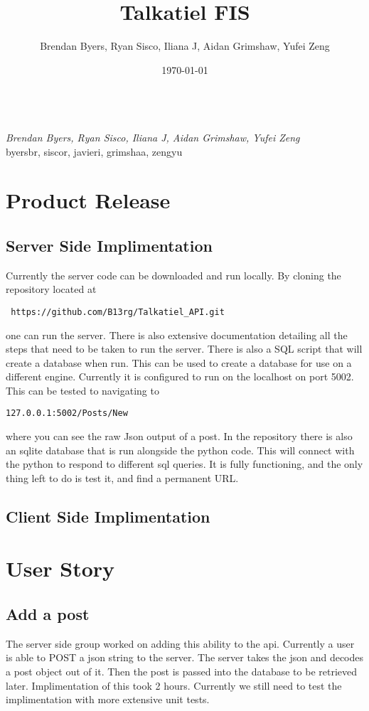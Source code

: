 \documentclass[12pt]{article}
\title{Talkatiel FIS}
\author{Brendan Byers, Ryan Sisco, Iliana J, Aidan Grimshaw, Yufei Zeng}
\date{\today}
\begin{document}
\begin{center}
      \Large\textbf{}\\
      \large\textit{Brendan Byers, Ryan Sisco, Iliana J, Aidan Grimshaw, Yufei Zeng}\\
      \large{byersbr, siscor, javieri, grimshaa, zengyu}\\
   \end{center}

\tableofcontents
\section{Product Release}
   \subsection{Server Side Implimentation}
   Currently the server code can be downloaded and run locally.  By cloning the repository located at\begin{verbatim} https://github.com/B13rg/Talkatiel_API.git \end{verbatim}one can run the server.  There is also extensive documentation detailing all the steps that need to be taken to run the server.  There is also a SQL script that will create a database when run.  This can be used to create a database for use on a different engine.  Currently it is configured to run on the localhost on port 5002.  This can be tested to navigating to \begin{verbatim}127.0.0.1:5002/Posts/New \end{verbatim}where you can see the raw Json output of a post.  In the repository there is also an sqlite database that is run alongside the python code.  This will connect with the python to respond to different sql queries.  It is fully functioning, and the only thing left to do is test it, and find a permanent URL.

   \subsection{Client Side Implimentation}
\section{User Story}
      \subsection{Add a post}
      The server side group worked on adding this ability to the api.  Currently a user is able to POST a json string to the server.  The server takes the json and decodes a post object out of it.  Then the post is passed into the database to be retrieved later.  Implimentation of this took 2 hours.  Currently we still need to test the implimentation with more extensive unit tests.
\end{document}
